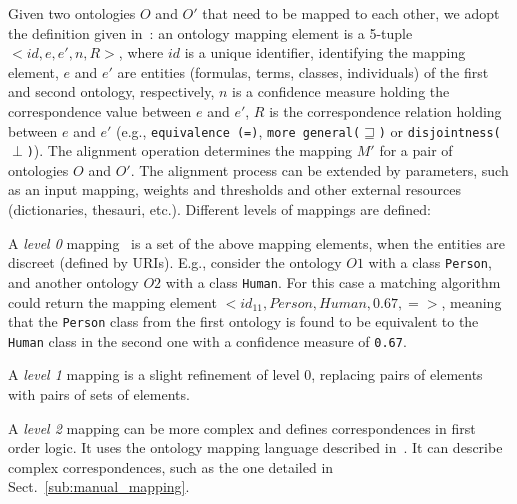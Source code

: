 Given two ontologies $O$ and $O'$ that need to be mapped to each other, we adopt the definition given in~\cite{shvaiko2005schema_based}: an ontology mapping element is a 5-tuple $<id, e, e', n, R>$, where 
$id$ is a unique identifier, identifying the
mapping element, 
$e$ and $e'$ are entities (formulas, terms, classes, individuals) of the first and second ontology, respectively, 
$n$ is a confidence measure holding the correspondence value between $e$ and
$e'$, 
$R$ is the correspondence relation holding between $e$ and $e'$ (e.g., \texttt{equivalence (=)}, \texttt{more general($\sqsupseteq$)} or \texttt{disjointness($\perp$)}).
The alignment operation determines the mapping $M'$ for a pair of ontologies $O$ and $O'$. The alignment process can be extended by parameters, such as an input mapping, weights and thresholds and other external resources (dictionaries, thesauri, etc.). Different levels of mappings are defined:

\begin{inparaenum}[(a)]
    \item A \textit{level 0} mapping~\cite{euzenat2004api} is a set of the above mapping elements, when the entities are discreet (defined by URIs). E.g., consider the ontology $O1$ with a class \texttt{Person}, and another ontology $O2$ with a class \texttt{Human}. For this case a matching algorithm  could return the mapping element $< id_{11}, Person, Human, 0.67, = >$, meaning that the \texttt{Person} class from the first ontology is found to be equivalent to the \texttt{Human} class in the second one with a confidence measure of \texttt{0.67}.
    \item A \textit{level 1} mapping is a slight refinement of level 0, replacing pairs of elements with pairs of sets of elements.
    \item A \textit{level 2} mapping can be more complex and defines correspondences in first order logic. It uses the ontology mapping language described in~\cite{scharffe2005language}. It can describe complex correspondences, such as the one detailed in Sect.~\ref{sub:manual_mapping}.
\end{inparaenum}
% 
 

